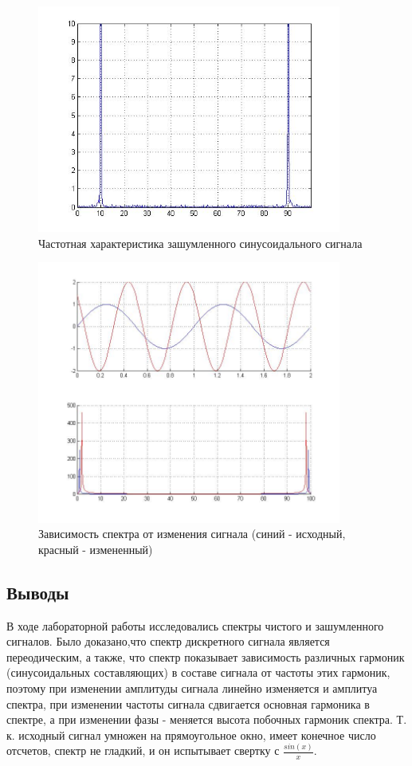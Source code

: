 \documentclass[10pt,a4paper]{article}
\begin{document}
\newpage
\begin{figure}[h]
\centering
\includegraphics[width=10cm]{4.jpg} 
\caption{Частотная характеристика зашумленного синусоидального сигнала} 
\label{fig.3} 
\end{figure}
\begin{figure}[h]\centering
\includegraphics[width=10cm]{comp} 
\caption{Зависимость спектра от изменения сигнала (синий - исходный, красный - измененный)} 
\label{fig.comp} 
\end{figure}
\FloatBarrier
\subsection{Выводы}
В ходе лабораторной работы исследовались спектры чистого и зашумленного сигналов. Было доказано,что спектр дискретного сигнала является переодическим, а также, что спектр показывает зависимость различных гармоник (синусоидальных составляющих) в составе сигнала от частоты этих гармоник, поэтому при изменении амплитуды сигнала линейно изменяется и амплитуа спектра, при изменении частоты сигнала сдвигается основная гармоника в спектре, а при изменении фазы - меняется высота побочных гармоник спектра. Т. к. исходный сигнал умножен на прямоугольное окно, имеет конечное число отсчетов, спектр не гладкий, и он испытывает свертку с $\frac{sin(x)}{x}$.
\end{document}
